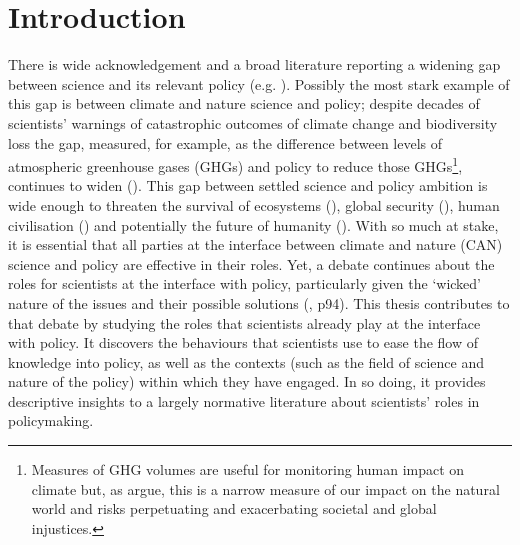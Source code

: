 \chapter{Introduction}\label{ch:intro}

There is wide acknowledgement and a broad literature reporting a widening gap between science and its relevant policy (e.g. \cite{Nau2009,EdlerKB2022}). Possibly the most stark example of this gap is between climate and nature science and policy; despite decades of scientists' warnings of catastrophic outcomes of climate change and biodiversity loss the gap, measured, for example, as the difference between levels of atmospheric greenhouse gases (GHGs) and policy to reduce those GHGs\footnote{Measures of GHG volumes are useful for monitoring human impact on climate but, as \textcite{MorenoSF2016} argue, this is a narrow measure of our impact on the natural world and risks perpetuating and exacerbating societal and global injustices.}, continues to widen (\cite{StoddardEtAl2021,IPBES2022,IPCC2023}). This gap between settled science and policy ambition is wide enough to threaten the survival of ecosystems (\cite{DiazEtAl2019,IPBES2022}), global security (\cite{WEF2024}), human civilisation (\cite{TschakertEAKO2019}) and potentially the future of humanity (\cite{McKayEtAl2022}). With so much at stake, it is essential that all parties at the interface between climate and nature (CAN) science and policy are effective in their roles. Yet, a debate continues about the roles for scientists at the interface with policy, particularly given the `wicked' nature of the issues and their possible solutions (\cite{Cairney2016}, p94). This thesis contributes to that debate by studying the roles that scientists already play at the interface with policy. It discovers the behaviours that scientists use to ease the flow of knowledge into policy, as well as the contexts (such as the field of science and nature of the policy) within which they have engaged. In so doing, it provides descriptive insights to a largely normative literature about scientists' roles in policymaking.

